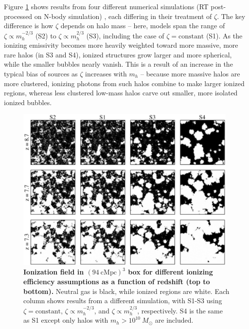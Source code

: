Figure \ref{fig:mcquinn} shows results from four different numerical simulations (RT post-processed on N-body simulation) \cite{McQuinn2007}, each differing in their treatment of $\zeta$. The key difference is how $\zeta$ depends on halo mass -- here, models span the range of $\zeta \propto m_h^{-2/3}$ (S2) to $\zeta \propto m_h^{2/3}$ (S3), including the case of $\zeta = \mathrm{constant}$ (S1). As the ionizing emissivity becomes more heavily weighted toward more massive, more rare halos (in S3 and S4), ionized structures grow larger and more spherical, while the smaller bubbles nearly vanish. This is a result of an increase in the typical bias of sources as $\zeta$ increases with $m_h$ -- because more massive halos are more clustered, ionizing photons from such halos combine to make larger ionized regions, whereas less clustered low-mass halos carve out smaller, more isolated ionized bubbles.

\begin{figure}[]
\begin{center}
\includegraphics[width=0.98\textwidth]{Mirocha/mcquinn2007_fig3.pdf}
\end{center}
\caption{{\bf Ionization field in $(94 \ \mathrm{cMpc})^3$ box for different ionizing efficiency assumptions \cite{McQuinn2007} as a function of redshift (top to bottom).} Neutral gas is black, while ionized regions are white.  Each column shows results from a different simulation, with S1-S3 using $\zeta=\mathrm{constant}$, $\zeta \propto m_h^{-2/3}$, and $\zeta \propto m_h^{2/3}$, respectively. S4 is the same as S1 except only halos with $m_h > 10^{10} \ M_{\odot}$ are included.}
\label{fig:mcquinn}
\end{figure}

